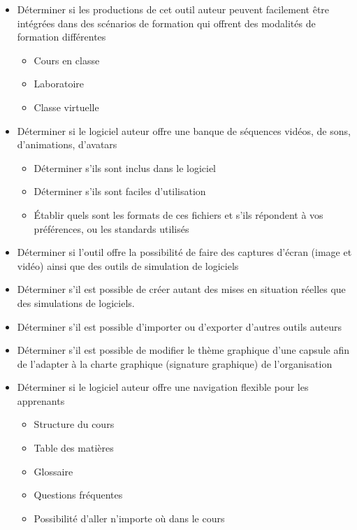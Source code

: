 {\begin{itemize}
\begin{itemize}
\item FLASH
\item HTML5
\item CD-ROM
\item EXÉCUTABLE
\item WORD / PDF
\end{itemize} 
\framebreak
\item Déterminer si les productions de cet outil auteur peuvent facilement être intégrées dans des scénarios de formation qui offrent des modalités de formation différentes 
\begin{itemize} 
\item  Cours en classe
\item  Laboratoire
\item  Classe virtuelle
\end{itemize} 
\item Déterminer si le logiciel auteur offre une banque de séquences vidéos, de sons, d'animations, d'avatars 
\begin{itemize} 
\item  Déterminer s'ils sont inclus dans le logiciel 
\item  Déterminer s'ils sont faciles d'utilisation 
\item  Établir quels sont les formats de ces fichiers et s'ils répondent à vos préférences, ou les standards utilisés 
\end{itemize} 
\item  Déterminer si l'outil offre la possibilité de faire des captures d'écran (image et vidéo) ainsi que des outils de simulation de logiciels 
\item Déterminer s'il est possible de créer autant des mises en situation réelles que des simulations de logiciels. 
\item Déterminer s'il est possible d'importer ou d'exporter d'autres outils auteurs 
\item Déterminer s'il est possible de modifier le thème graphique d'une capsule afin de l'adapter à la charte graphique (signature graphique) de l'organisation 
\framebreak
\item Déterminer si le logiciel auteur offre une navigation flexible pour les apprenants 
\begin{itemize} 
\item  Structure du cours
\item  Table des matières
\item  Glossaire
\item  Questions fréquentes
\item  Possibilité d'aller n'importe où dans le cours

\end{itemize}
\end{itemize}}
